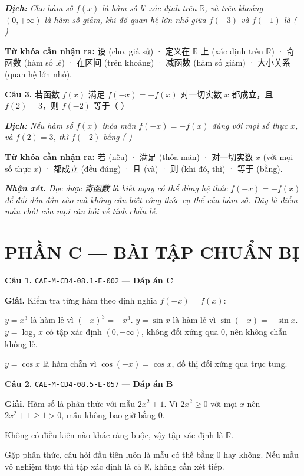 \documentclass[11pt, a4paper]{article}
\begin{document}
\noindent\emph{\textbf{Dịch:} Cho hàm số $f(x)$ là hàm số lẻ xác định trên $\mathbb{R}$, và trên khoảng $(0, +\infty)$ là hàm số giảm, khi đó quan hệ lớn nhỏ giữa $f(-3)$ và $f(-1)$ là ( )}

\textbf{Từ khóa cần nhận ra:} 设 (cho, giả sử) · 定义在 $\mathbb{R}$ 上 (xác định trên $\mathbb{R}$) · 奇函数 (hàm số lẻ) · 在区间 (trên khoảng) · 减函数 (hàm số giảm) · 大小关系 (quan hệ lớn nhỏ).

\textbf{Câu 3.} 若函数 $f(x)$ 满足 $f(-x)=-f(x)$ 对一切实数 $x$ 都成立，且 $f(2)=3$，则 $f(-2)$ 等于（ ）

\noindent\emph{\textbf{Dịch:} Nếu hàm số $f(x)$ thỏa mãn $f(-x) = -f(x)$ đúng với mọi số thực $x$, và $f(2) = 3$, thì $f(-2)$ bằng ( )}

\textbf{Từ khóa cần nhận ra:} 若 (nếu) · 满足 (thỏa mãn) · 对一切实数 $x$ (với mọi số thực $x$) · 都成立 (đều đúng) · 且 (và) · 则 (khi đó, thì) · 等于 (bằng).

\noindent\emph{\textbf{Nhận xét.} Đọc được 奇函数 là biết ngay có thể dùng hệ thức $f(-x) = -f(x)$ để đổi dấu đầu vào mà không cần biết công thức cụ thể của hàm số. Đây là điểm mấu chốt của mọi câu hỏi về tính chẵn lẻ.}

\section{PHẦN C — BÀI TẬP CHUẨN BỊ}

\textbf{Câu 1.} \texttt{CAE-M-CD4-08.1-E-002} — \textbf{Đáp án C}

\textbf{Giải.} Kiểm tra từng hàm theo định nghĩa $f(-x) = f(x)$:

$y = x^3$ là hàm lẻ vì $(-x)^3 = -x^3$. $y = \sin x$ là hàm lẻ vì $\sin(-x) = -\sin x$. $y = \log_2 x$ có tập xác định $(0, +\infty)$, không đối xứng qua $0$, nên không chẵn không lẻ.

$y = \cos x$ là hàm chẵn vì $\cos(-x) = \cos x$, đồ thị đối xứng qua trục tung.

\textbf{Câu 2.} \texttt{CAE-M-CD4-08.5-E-057} — \textbf{Đáp án B}

\textbf{Giải.} Hàm số là phân thức với mẫu $2x^2 + 1$. Vì $2x^2 \ge 0$ với mọi $x$ nên $2x^2 + 1 \ge 1 > 0$, mẫu không bao giờ bằng $0$.

Không có điều kiện nào khác ràng buộc, vậy tập xác định là $\mathbb{R}$.

 Gặp phân thức, câu hỏi đầu tiên luôn là mẫu có thể bằng $0$ hay không. Nếu mẫu vô nghiệm thực thì tập xác định là cả $\mathbb{R}$, không cần xét tiếp.
\end{document}
